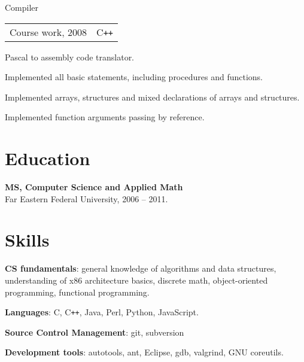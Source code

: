 \documentclass[a4paper]{article}
\begin{document}
\begin{multicols}{2}
		\begin{project2}{Compiler}{\begin{tabular}{@{}l|l}Course work, 2008 & C\texttt{++}\\\end{tabular}}
			Pascal to assembly code translator.
			\begin{items}
				\item Implemented all basic statements, including procedures and functions.
				\item Implemented arrays, structures and mixed declarations of arrays and structures.
				\item Implemented function arguments passing by reference.
			\end{items}
		\end{project2}
	\end{multicols}

	\section{Education}
		\begin{multicols}{2}
			\raggedcolumns
			\begin{items}
				\item \textbf{MS, Computer Science and Applied Math}\\
				Far Eastern Federal University, 2006 -- 2011.
			\end{items}
			\columnbreak
			\hspace{10mm}
		\end{multicols}

	\section{Skills}
	\begin{multicols}{2}
		\raggedcolumns
		\begin{items}
			\item \textbf{CS fundamentals}: general knowledge of algorithms and data structures, understanding of x86 architecture basics, discrete math, object-oriented programming, functional programming.
			\item \textbf{Languages}: C, C\texttt{++}, Java, Perl, Python, JavaScript.
			\columnbreak
			\item \textbf{Source Control Management}: git, subversion
			\item \textbf{Development tools}: autotools, ant, Eclipse, gdb, valgrind, GNU coreutils.
		\end{items}
	\end{multicols}
\end{document}
